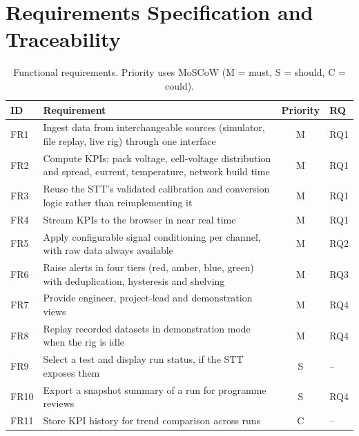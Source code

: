\section{Requirements Specification and Traceability}
\label{sec:trace}

\begin{table}[H]
    \centering\small
    \caption{Functional requirements. Priority uses MoSCoW (M = must, S = should, C = could).}
    \label{tab:fr}
    \begin{tabularx}{\textwidth}{lYcl}
        \toprule
        ID   & Requirement                                                                                                & Priority & RQ  \\
        \midrule
        FR1  & Ingest data from interchangeable sources (simulator, file replay, live rig) through one interface          & M        & RQ1 \\
        FR2  & Compute KPIs: pack voltage, cell-voltage distribution and spread, current, temperature, network build time & M        & RQ1 \\
        FR3  & Reuse the STT's validated calibration and conversion logic rather than reimplementing it                   & M        & RQ1 \\
        FR4  & Stream KPIs to the browser in near real time                                                               & M        & RQ1 \\
        FR5  & Apply configurable signal conditioning per channel, with raw data always available                         & M        & RQ2 \\
        FR6  & Raise alerts in four tiers (red, amber, blue, green) with deduplication, hysteresis and shelving           & M        & RQ3 \\
        FR7  & Provide engineer, project-lead and demonstration views                                                     & M        & RQ4 \\
        FR8  & Replay recorded datasets in demonstration mode when the rig is idle                                        & M        & RQ4 \\
        FR9  & Select a test and display run status, if the STT exposes them                                              & S        & --  \\
        FR10 & Export a snapshot summary of a run for programme reviews                                                   & S        & RQ4 \\
        FR11 & Store KPI history for trend comparison across runs                                                         & C        & --  \\
        \bottomrule
    \end{tabularx}
\end{table}

